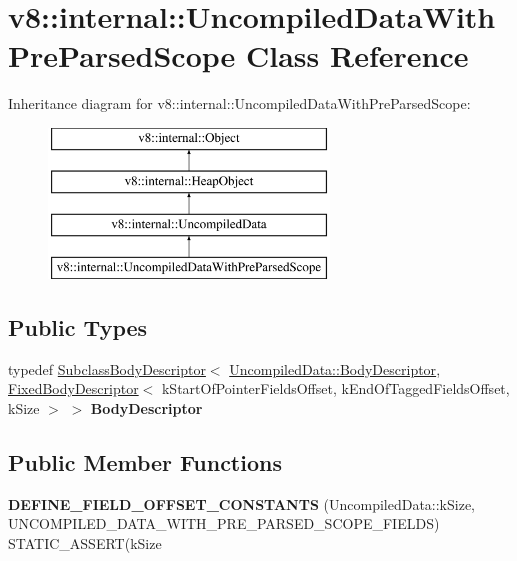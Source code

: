 \hypertarget{classv8_1_1internal_1_1UncompiledDataWithPreParsedScope}{}\section{v8\+:\+:internal\+:\+:Uncompiled\+Data\+With\+Pre\+Parsed\+Scope Class Reference}
\label{classv8_1_1internal_1_1UncompiledDataWithPreParsedScope}
Inheritance diagram for v8\+:\+:internal\+:\+:Uncompiled\+Data\+With\+Pre\+Parsed\+Scope\+:\begin{figure}[H]
\begin{center}
\leavevmode
\includegraphics[height=4.000000cm]{classv8_1_1internal_1_1UncompiledDataWithPreParsedScope}
\end{center}
\end{figure}
\subsection*{Public Types}
\begin{DoxyCompactItemize}
\item 
\mbox{\label{classv8_1_1internal_1_1UncompiledDataWithPreParsedScope_ac30d7e1b700f8cb8c5aabd98860e3f8e}} 
typedef \mbox{\hyperlink{classv8_1_1internal_1_1SubclassBodyDescriptor}{Subclass\+Body\+Descriptor}}$<$ \mbox{\hyperlink{classv8_1_1internal_1_1FixedBodyDescriptor}{Uncompiled\+Data\+::\+Body\+Descriptor}}, \mbox{\hyperlink{classv8_1_1internal_1_1FixedBodyDescriptor}{Fixed\+Body\+Descriptor}}$<$ k\+Start\+Of\+Pointer\+Fields\+Offset, k\+End\+Of\+Tagged\+Fields\+Offset, k\+Size $>$ $>$ {\bfseries Body\+Descriptor}
\end{DoxyCompactItemize}
\subsection*{Public Member Functions}
\begin{DoxyCompactItemize}
\item 
\mbox{\label{classv8_1_1internal_1_1UncompiledDataWithPreParsedScope_aabf053e496eb7453422d6c1f1cb7ed32}} 
{\bfseries D\+E\+F\+I\+N\+E\+\_\+\+F\+I\+E\+L\+D\+\_\+\+O\+F\+F\+S\+E\+T\+\_\+\+C\+O\+N\+S\+T\+A\+N\+TS} (Uncompiled\+Data\+::k\+Size, U\+N\+C\+O\+M\+P\+I\+L\+E\+D\+\_\+\+D\+A\+T\+A\+\_\+\+W\+I\+T\+H\+\_\+\+P\+R\+E\+\_\+\+P\+A\+R\+S\+E\+D\+\_\+\+S\+C\+O\+P\+E\+\_\+\+F\+I\+E\+L\+DS) S\+T\+A\+T\+I\+C\+\_\+\+A\+S\+S\+E\+RT(k\+Size
\end{DoxyCompactItemize}
